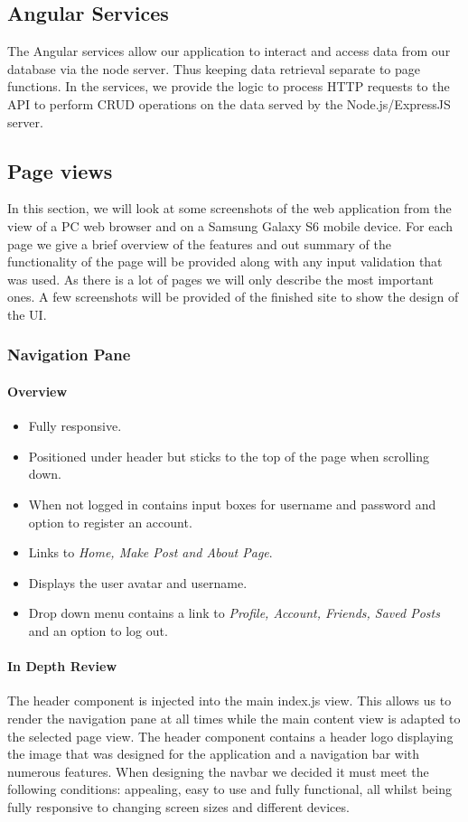 \subsection{Angular Services}
The Angular services allow our application to interact and access data from our database via the node server. Thus keeping data retrieval separate to page functions. In the services, we provide the logic to process HTTP requests to the API to perform CRUD operations on the data served by the Node.js/ExpressJS server. 

\subsection{Page views}
In this section, we will look at some screenshots of the web application from the view of a PC web browser and on a Samsung Galaxy S6 mobile device. For each page we give a brief overview of the features and out summary of the functionality of the page will be provided along with any input validation that was used. As there is a lot of pages we will only describe the most important ones. A few screenshots will be provided of the finished site to show the design of the UI.


\subsubsection{Navigation Pane}
\paragraph{Overview\newline}

\begin{itemize}
    \item Fully responsive.
    \item Positioned under header but sticks to the top of the page when scrolling down.
    \item When not logged in contains input boxes for username and password and option to register an account.
    \item Links to \textit{Home, Make Post and About Page}.
    \item Displays the user avatar and username.
    \item Drop down menu contains a link to \textit{Profile, Account, Friends, Saved Posts} and an option to log out.
\end{itemize}

\paragraph{In Depth Review\newline}
The header component is injected into the main index.js view. This allows us to render the navigation pane at all times while the main content view is adapted to the selected page view. The header component contains a header logo displaying the image that was designed for the application and a navigation bar with numerous features. When designing the navbar we decided it must meet the following conditions: appealing, easy to use and fully functional, all whilst being fully responsive to changing screen sizes and different devices.

